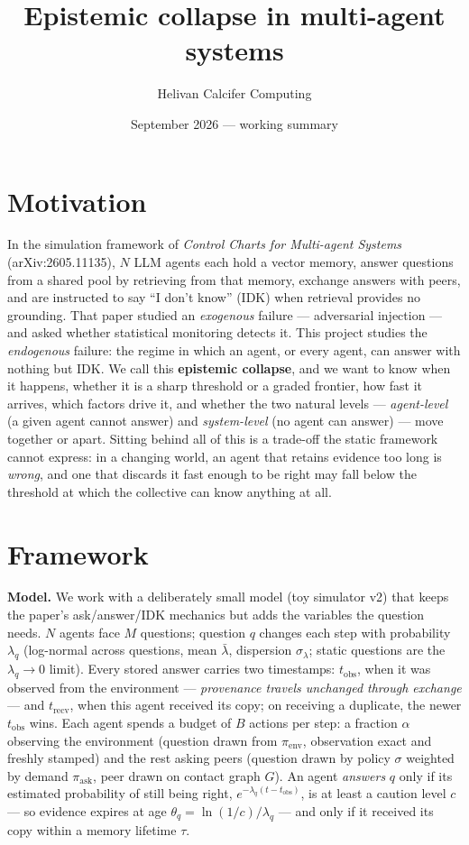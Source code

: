 \documentclass[10pt,twocolumn]{article}
\title{\vspace{-1.2em}\textbf{Epistemic collapse in multi-agent systems}}
\author{Helivan \quad Calcifer Computing}
\date{September 2026 --- working summary}
\begin{document}
\maketitle

\section*{Motivation}
In the simulation framework of \emph{Control Charts for Multi-agent
Systems} (arXiv:2605.11135), $N$ LLM agents each hold a vector memory,
answer questions from a shared pool by retrieving from that memory,
exchange answers with peers, and are instructed to say ``I don't know''
(IDK) when retrieval provides no grounding. That paper studied an
\emph{exogenous} failure --- adversarial injection --- and asked whether
statistical monitoring detects it. This project studies the
\emph{endogenous} failure: the regime in which an agent, or every agent,
can answer with nothing but IDK. We call this \textbf{epistemic
collapse}, and we want to know when it happens, whether it is a sharp
threshold or a graded frontier, how fast it arrives, which factors drive
it, and whether the two natural levels --- \emph{agent-level} (a given
agent cannot answer) and \emph{system-level} (no agent can answer) ---
move together or apart. Sitting behind all of this is a trade-off the
static framework cannot express: in a changing world, an agent that
retains evidence too long is \emph{wrong}, and one that discards it fast
enough to be right may fall below the threshold at which the collective
can know anything at all.

\section*{Framework}
\textbf{Model.} We work with a deliberately small model (toy simulator
v2) that keeps the paper's ask/answer/IDK mechanics but adds the
variables the question needs. $N$ agents face $M$ questions; question $q$
changes each step with probability $\lambda_q$ (log-normal across
questions, mean $\bar\lambda$, dispersion $\sigma_\lambda$; static
questions are the $\lambda_q\to0$ limit). Every stored answer carries two
timestamps: $t_{\mathrm{obs}}$, when it was observed from the
environment --- \emph{provenance travels unchanged through exchange} ---
and $t_{\mathrm{recv}}$, when this agent received its copy; on receiving
a duplicate, the newer $t_{\mathrm{obs}}$ wins. Each agent spends a
budget of $B$ actions per step: a fraction $\alpha$ observing the
environment (question drawn from $\pi_{\mathrm{env}}$, observation exact
and freshly stamped) and the rest asking peers (question drawn by policy
$\sigma$ weighted by demand $\pi_{\mathrm{ask}}$, peer drawn on contact
graph $G$). An agent \emph{answers} $q$ only if its estimated probability
of still being right, $e^{-\lambda_q(t - t_{\mathrm{obs}})}$, is at least
a caution level $c$ --- so evidence expires at age
$\theta_q = \ln(1/c)/\lambda_q$ --- and only if it received its copy
within a memory lifetime $\tau$.
\end{document}
